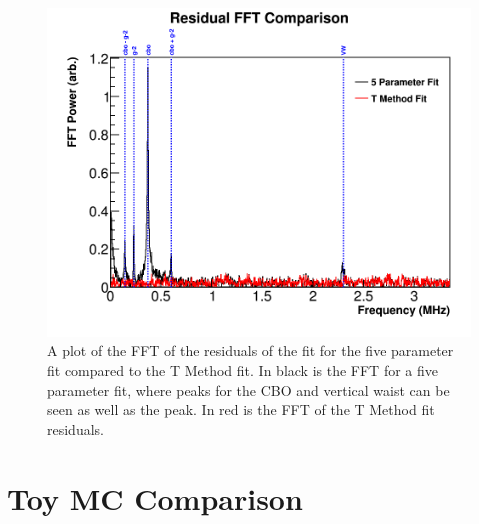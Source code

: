 	\begin{figure}[]
		\centering
		\includegraphics[width=\textwidth]{FFTComparison_TMethod}
	    \caption[FFTComparison_TMethod]{A plot of the FFT of the residuals of the fit for the five parameter fit compared to the T Method fit. In black is the FFT for a five parameter fit, where peaks for the CBO and vertical waist can be seen as well as the \gmtwo peak. In red is the FFT of the T Method fit residuals.}
	    \label{fig:FFTComparison_TMethod}
	\end{figure}






\section{Toy MC Comparison}
